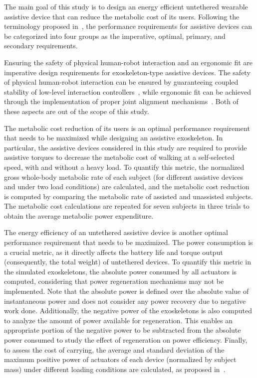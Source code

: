 \documentclass[10pt,letterpaper]{article}
\begin{document}
The main goal of this study is to design an energy efficient untethered wearable assistive device that can reduce the metabolic cost of its users. Following the terminology proposed in~\cite{merlet2006parallel},  the performance requirements for assistive devices can be categorized into four groups as the imperative, optimal, primary, and secondary requirements.

Ensuring the safety of physical human-robot interaction and an ergonomic fit are imperative design requirements for exoskeleton-type assistive devices. The safety of physical human-robot interaction can be ensured by guaranteeing coupled stability of low-level interaction controllers~\cite{FatihEmre2020,aydin2018stable,Erdogan2011c,tokatli2015stability,mengilli2021passivity,mengilli2020},
 while ergonomic fit can be achieved through the implementation of proper joint alignment mechanisms~\cite{Ergin2011,Ergin2012,MustafaVolkan2012,BesirVolkan2013,Erdogan2016}. Both of these aspects are out of the scope of this study.


The metabolic cost reduction of its users is an optimal performance requirement that needs to be maximized while designing an assistive exoskeleton. In particular, the assistive devices considered in this study are required to provide assistive torques to decrease the metabolic cost of walking at a self-selected speed, with and without a heavy load. To quantify this metric, the normalized gross whole-body metabolic rate of each subject (for different assistive devices and under two load conditions) are calculated, and the metabolic cost reduction is computed by comparing the metabolic rate of assisted and unassisted subjects. The  metabolic cost calculations are repeated for seven subjects in three trials to obtain the  average metabolic power expenditure. %

The energy efficiency of an untethered assistive device is another optimal performance requirement that needs to be maximized. The power consumption is a crucial metric, as it directly affects the battery life and torque output (consequently, the total weight) of untethered devices. To quantify this metric in the simulated exoskeletons, the absolute power consumed by all actuators is computed, considering that power regeneration mechanisms may not be implemented. Note that the absolute power is defined over the absolute value of instantaneous power and does not consider any power recovery due to negative work done. Additionally, the negative power of the exoskeletons is also computed to analyze the amount of power available for regeneration. This enables an appropriate portion of the negative power to be subtracted from the absolute power consumed  to study the effect of regeneration on power efficiency. Finally, to assess the cost of carrying, the average and standard deviation of the maximum positive power of actuators of each device (normalized by subject mass)  under different loading conditions are calculated, as proposed in~\cite{Dembia2017}.
\end{document}

